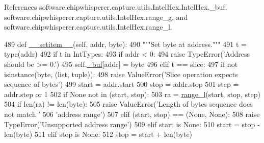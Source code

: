 References software.\+chipwhisperer.\+capture.\+utils.\+Intel\+Hex.\+Intel\+Hex.\+\_\+buf, software.\+chipwhisperer.\+capture.\+utils.\+Intel\+Hex.\+range\+\_\+g, and software.\+chipwhisperer.\+capture.\+utils.\+Intel\+Hex.\+range\+\_\+l.


\begin{DoxyCode}
489     \textcolor{keyword}{def }\hyperlink{classsoftware_1_1chipwhisperer_1_1capture_1_1utils_1_1IntelHex_1_1IntelHex_abbe9f60e13d163ec0926fa66727015e4}{\_\_setitem\_\_}(self, addr, byte):
490         \textcolor{stringliteral}{"""Set byte at address."""}
491         t = type(addr)
492         \textcolor{keywordflow}{if} t \textcolor{keywordflow}{in} IntTypes:
493             \textcolor{keywordflow}{if} addr < 0:
494                 \textcolor{keywordflow}{raise} TypeError(\textcolor{stringliteral}{'Address should be >= 0.'})
495             self.\hyperlink{classsoftware_1_1chipwhisperer_1_1capture_1_1utils_1_1IntelHex_1_1IntelHex_a9acc18c6165db7a6540c07688a8e09ac}{\_buf}[addr] = byte
496         \textcolor{keywordflow}{elif} t == slice:
497             \textcolor{keywordflow}{if} \textcolor{keywordflow}{not} isinstance(byte, (list, tuple)):
498                 \textcolor{keywordflow}{raise} ValueError(\textcolor{stringliteral}{'Slice operation expects sequence of bytes'})
499             start = addr.start
500             stop = addr.stop
501             step = addr.step \textcolor{keywordflow}{or} 1
502             \textcolor{keywordflow}{if} \textcolor{keywordtype}{None} \textcolor{keywordflow}{not} \textcolor{keywordflow}{in} (start, stop):
503                 ra = \hyperlink{namespacesoftware_1_1chipwhisperer_1_1capture_1_1utils_1_1IntelHex_ae461be5d25f46823cb710380e27eb1a1}{range\_l}(start, stop, step)
504                 \textcolor{keywordflow}{if} len(ra) != len(byte):
505                     \textcolor{keywordflow}{raise} ValueError(\textcolor{stringliteral}{'Length of bytes sequence does not match '}
506                         \textcolor{stringliteral}{'address range'})
507             \textcolor{keywordflow}{elif} (start, stop) == (\textcolor{keywordtype}{None}, \textcolor{keywordtype}{None}):
508                 \textcolor{keywordflow}{raise} TypeError(\textcolor{stringliteral}{'Unsupported address range'})
509             \textcolor{keywordflow}{elif} start \textcolor{keywordflow}{is} \textcolor{keywordtype}{None}:
510                 start = stop - len(byte)
511             \textcolor{keywordflow}{elif} stop \textcolor{keywordflow}{is} \textcolor{keywordtype}{None}:
512                 stop = start + len(byte)

\end{DoxyCode}

